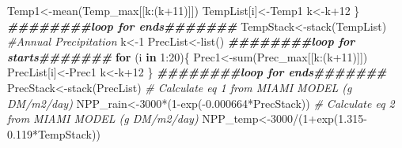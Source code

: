 \documentclass[
  10pt,
  b5paper,
]{book}
\newenvironment{Shaded}{\begin{snugshade}}{\end{snugshade}}
\newcommand{\CommentTok}[1]{\textcolor[rgb]{0.56,0.35,0.01}{\textit{#1}}}
\newcommand{\ControlFlowTok}[1]{\textcolor[rgb]{0.13,0.29,0.53}{\textbf{#1}}}
\newcommand{\DecValTok}[1]{\textcolor[rgb]{0.00,0.00,0.81}{#1}}
\newcommand{\DocumentationTok}[1]{\textcolor[rgb]{0.56,0.35,0.01}{\textbf{\textit{#1}}}}
\newcommand{\FloatTok}[1]{\textcolor[rgb]{0.00,0.00,0.81}{#1}}
\newcommand{\FunctionTok}[1]{\textcolor[rgb]{0.00,0.00,0.00}{#1}}
\newcommand{\NormalTok}[1]{#1}
\newcommand{\OtherTok}[1]{\textcolor[rgb]{0.56,0.35,0.01}{#1}}
\newcommand{\SpecialCharTok}[1]{\textcolor[rgb]{0.00,0.00,0.00}{#1}}
\begin{document}
\begin{Shaded}
\begin{Highlighting}[]
\NormalTok{Temp1}\OtherTok{\textless{}{-}}\FunctionTok{mean}\NormalTok{(Temp\_max[[k}\SpecialCharTok{:}\NormalTok{(k}\SpecialCharTok{+}\DecValTok{11}\NormalTok{)]])}
\NormalTok{TempList[i]}\OtherTok{\textless{}{-}}\NormalTok{Temp1}
\NormalTok{k}\OtherTok{\textless{}{-}}\NormalTok{k}\SpecialCharTok{+}\DecValTok{12}
\NormalTok{\}}
\DocumentationTok{\#\#\#\#\#\#\#\#loop for ends\#\#\#\#\#\#\#}
\NormalTok{TempStack}\OtherTok{\textless{}{-}}\FunctionTok{stack}\NormalTok{(TempList)}
\CommentTok{\#Annual Precipitation}
\NormalTok{k}\OtherTok{\textless{}{-}}\DecValTok{1}
\NormalTok{PrecList}\OtherTok{\textless{}{-}}\FunctionTok{list}\NormalTok{()}
\DocumentationTok{\#\#\#\#\#\#\#\#loop for starts\#\#\#\#\#\#\#}
\ControlFlowTok{for}\NormalTok{ (i }\ControlFlowTok{in} \DecValTok{1}\SpecialCharTok{:}\DecValTok{20}\NormalTok{)\{}
\NormalTok{Prec1}\OtherTok{\textless{}{-}}\FunctionTok{sum}\NormalTok{(Prec\_max[[k}\SpecialCharTok{:}\NormalTok{(k}\SpecialCharTok{+}\DecValTok{11}\NormalTok{)]])}
\NormalTok{PrecList[i]}\OtherTok{\textless{}{-}}\NormalTok{Prec1}
\NormalTok{k}\OtherTok{\textless{}{-}}\NormalTok{k}\SpecialCharTok{+}\DecValTok{12}
\NormalTok{\}}
\DocumentationTok{\#\#\#\#\#\#\#\#loop for ends\#\#\#\#\#\#\#}
\NormalTok{PrecStack}\OtherTok{\textless{}{-}}\FunctionTok{stack}\NormalTok{(PrecList)}
\CommentTok{\# Calculate eq 1 from MIAMI MODEL (g DM/m2/day)}
\NormalTok{NPP\_rain}\OtherTok{\textless{}{-}}\DecValTok{3000}\SpecialCharTok{*}\NormalTok{(}\DecValTok{1}\SpecialCharTok{{-}}\FunctionTok{exp}\NormalTok{(}\SpecialCharTok{{-}}\FloatTok{0.000664}\SpecialCharTok{*}\NormalTok{PrecStack))}
\CommentTok{\# Calculate eq 2 from MIAMI MODEL (g DM/m2/day)}
\NormalTok{NPP\_temp}\OtherTok{\textless{}{-}}\DecValTok{3000}\SpecialCharTok{/}\NormalTok{(}\DecValTok{1}\SpecialCharTok{+}\FunctionTok{exp}\NormalTok{(}\FloatTok{1.315{-}0.119}\SpecialCharTok{*}\NormalTok{TempStack))}


\end{Highlighting}
\end{Shaded}
\end{document}
